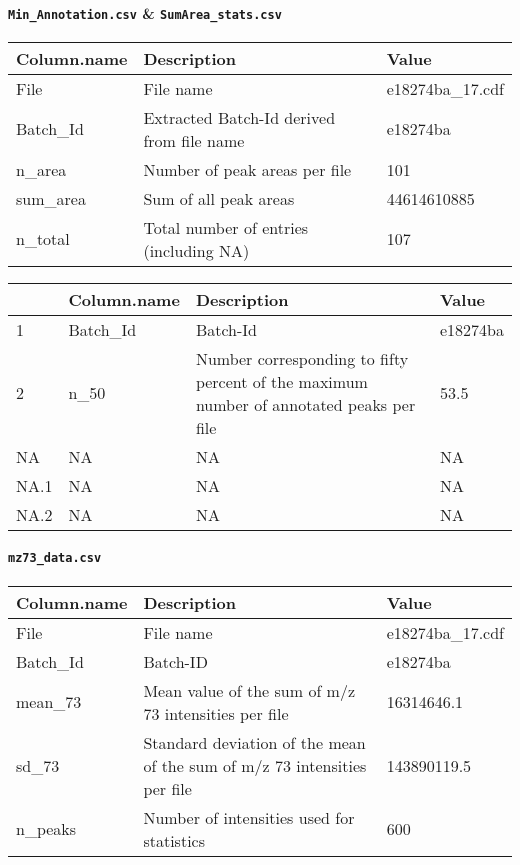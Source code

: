 \documentclass[]{book}
\let\oldparagraph\paragraph
\renewcommand{\paragraph}[1]{\oldparagraph{#1}\mbox{}}
\begin{document}
\hypertarget{min_annotation.csv-sumarea_stats.csv}{%
\paragraph{\texorpdfstring{\texttt{Min\_Annotation.csv} \& \texttt{SumArea\_stats.csv}}{Min\_Annotation.csv \& SumArea\_stats.csv}}\label{min_annotation.csv-sumarea_stats.csv}}

\begin{tabu} to 
\toprule
Column.name & Description & Value\\
\midrule
{}  File & File name & e18274ba\_17.cdf\\
Batch\_Id & Extracted Batch-Id derived from file name & e18274ba\\
  n\_area & Number of peak areas per file & 101\\
sum\_area & Sum of all peak areas & 44614610885\\
  n\_total & Total number of entries (including NA) & 107\\
\bottomrule
\end{tabu}

\begin{tabu} to 
\toprule
  & Column.name & Description & Value\\
\midrule
{}  1 & Batch\_Id & Batch-Id & e18274ba\\
2 & n\_50 & Number corresponding to fifty percent of the maximum number of annotated peaks per file & 53.5\\
  NA & NA & NA & NA\\
NA.1 & NA & NA & NA\\
  NA.2 & NA & NA & NA\\
\bottomrule
\end{tabu}

\hypertarget{mz73_data.csv}{%
\paragraph{\texorpdfstring{\texttt{mz73\_data.csv}}{mz73\_data.csv}}\label{mz73_data.csv}}

\begin{tabu} to 
\toprule
Column.name & Description & Value\\
\midrule
{}  File & File name & e18274ba\_17.cdf\\
Batch\_Id & Batch-ID & e18274ba\\
  mean\_73 & Mean value of the sum of m/z 73 intensities per file & 16314646.1\\
sd\_73 & Standard deviation of the mean of the sum of m/z 73 intensities per file & 143890119.5\\
  n\_peaks & Number of intensities used for statistics & 600\\
\bottomrule
\end{tabu}
\end{document}

